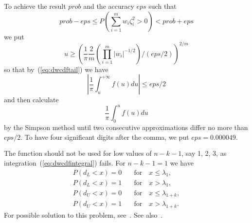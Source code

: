 \documentclass[a4paper,11pt]{article}
\renewcommand{\Pr}{\mathit{P}}
\begin{document}
To achieve the result $\mathit{prob}$ and the accuracy $\mathit{eps}$
such that
\begin{equation} \label{eq:dwcdfprob}
  \mathit{prob} - \mathit{eps} \leq \Pr \left( \sum_{i = 1}^m w_i
  \zeta_i^2 > 0 \right) < \mathit{prob} + \mathit{eps}
\end{equation}
we put
\begin{equation} \label{eq:dwcdfupperlimit}
  u \geq (\frac{1}{\pi} \frac{2}{m} (\prod_{i = 1}^m |w_i|^{-1 / 2}) /
  (\mathit{eps} / 2))^{2 / m}
\end{equation}
so that by~(\ref{eq:dwcdftail}) we have \[ |\frac{1}{\pi}
\int_u^{+\infty} f(u) du| \leq \mathit{eps} / 2 \] and then calculate
\begin{equation} \label{eq:dwcdfintegral}
  \frac{1}{\pi} \int_0^u f(u) du
\end{equation}
by the Simpson method until two consecutive approximations differ no
more than $\mathit{eps} / 2$. To have four significant digits after the
comma, we put $\mathit{eps} = 0.000049$.

The function should not be used for low values of $n - k - 1$, say 1, 2,
3, as integration~(\ref{eq:dwcdfintegral}) fails. For $n - k - 1 = 1$ we
have
\begin{align*}
  \Pr(d_L < x) = 0 & \quad \mathrm{for} \quad x \leq \lambda_1, \\
  \Pr(d_L < x) = 1 & \quad \mathrm{for} \quad x > \lambda_1, \\
  \Pr(d_U < x) = 0 & \quad \mathrm{for} \quad x \leq \lambda_{1 + k}, \\
  \Pr(d_U < x) = 1 & \quad \mathrm{for} \quad x > \lambda_{1 + k}.
\end{align*}
For possible solution to this problem, see~\cite{farebrother-1984}. See
also~\cite{savin-white-1977}.



\end{document}
